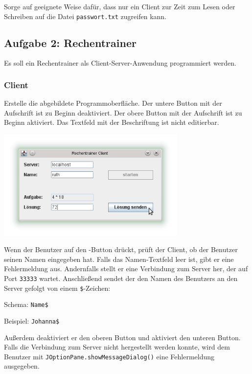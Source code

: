 Sorge auf geeignete Weise dafür, dass nur ein Client zur Zeit zum Lesen oder
Schreiben auf die Datei \lstinline|passwort.txt| zugreifen kann.


\subsection{Aufgabe 2: Rechentrainer}

Es soll ein Rechentrainer als Client-Server-Anwendung programmiert werden.

\subsubsection{Client}

Erstelle die abgebildete Programmoberfläche. Der untere Button mit der
Aufschrift  ist zu Beginn deaktiviert. Der obere
Button mit der Aufschrift  ist zu Beginn aktiviert. Das
Textfeld mit der Beschriftung  ist nicht editierbar.

\begin{center}
\includegraphics[width=0.7\textwidth]{./inf/SEKII/44_Abi-Training/Rechentrainer.png}
\end{center}

Wenn der Benutzer auf den -Button drückt, prüft der Client,
ob der Benutzer seinen Namen eingegeben hat. Falls das Namen-Textfeld leer ist,
gibt er eine Fehlermeldung aus. Andernfalls stellt er eine Verbindung zum
Server her, der auf Port \lstinline|33333| wartet. Anschließend sendet der den
Namen des Benutzers an den Server gefolgt von einem \lstinline|$|-Zeichen:

Schema:  \lstinline|Name$|	

Beispiel: \lstinline|Johanna$|

Außerdem deaktiviert er den oberen Button und aktiviert den unteren Button.
Falls die Verbindung zum Server nicht hergestellt werden konnte, wird dem
Benutzer mit \lstinline|JOptionPane.showMessageDialog()| eine Fehlermeldung
ausgegeben.

